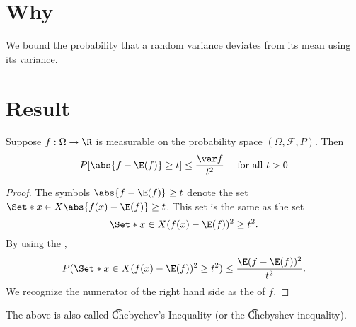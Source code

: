 
\section*{Why}

We bound the probability that a random variance deviates from its mean using its variance.

\section*{Result}


\begin{proposition}
Suppose $f: \Omega  \to \R $ is measurable on the probability space $(\Omega , \mathcal{F} , P)$.
Then
\[
P[\abs{f - \E (f)} \geq t] \leq \frac{\var f}{t^2} \quad \text{ for all } t > 0
\]
\begin{proof}The symbols $\abs{f - \E (f)} \geq t$ denote the set $\Set*{x \in X}{ \abs{f(x) - \E (f)} \geq t}$.
This set is the same as the set
\[
\Set*{x \in X}{({f(x) - \E (f)})^2 \geq t^2}.
\]
By using the ,
\[
P(\Set*{x \in X}{({f(x) - \E (f)})^2 \geq t^2})
\leq
\frac{\E (f - \E (f))^2}{t^2}.
\]
We recognize the numerator of the right hand side as the of $f$.\end{proof}
\end{proposition}

The above is also called \t{Chebychev's Inequality} (or the \t{Chebyshev inequality}).

\blankpage
